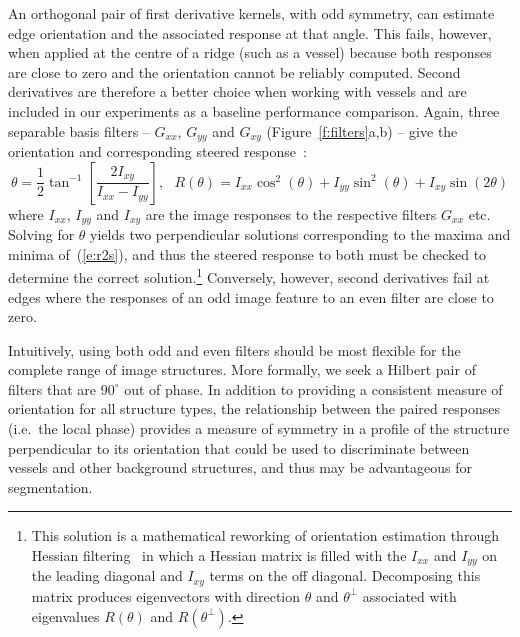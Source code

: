 \documentclass[runningheads,a4paper]{llncs}
\newcommand{\fref}[1]{Figure~\ref{#1}}
\newcommand{\eref}[1]{(\ref{#1})}
\def\Gxx{G_{xx}}
\def\Gxy{G_{xy}} \def\Gyx{G_{yx}}
\def\Gyy{G_{yy}}
\def\Ixx{I_{xx}}
\def\Ixy{I_{xy}}
\def\Iyy{I_{yy}}
\def\ie{i.e.}
\begin{document}
An orthogonal pair of first derivative kernels, with odd symmetry, can estimate edge orientation and the associated response at that angle. This fails, however, when applied at the centre of a ridge (such as a vessel) because both responses are close to zero and the orientation cannot be reliably computed. Second derivatives are therefore a better choice when working with vessels and are included in our experiments as a baseline performance comparison. Again, three separable basis filters -- $\Gxx$, $\Gyy$ and $\Gxy$ (\fref{f:filters}a,b) -- give the orientation and corresponding steered response~\cite{Freeman_Adelson_TPAMI91,Koenderink_vanDoorn_TPAMI92,Karssemeijer_teBrake_TMI96}:
%
\begin{equation}
\theta = \frac{1}{2}\tan^{-1}\left[ \frac{2\Ixy}{\Ixx-\Iyy} \right], \,\,\,\, R(\theta) = \Ixx \cos^2(\theta) + \Iyy \sin^2(\theta) + \Ixy \sin(2\theta)
\label{e:r2s}
\end{equation}
%
\noindent where $\Ixx$, $\Iyy$ and $\Ixy$  are the image responses to the respective filters $\Gxx$ etc. Solving for $\theta$ yields two perpendicular solutions corresponding to the maxima and minima of~\eref{e:r2s}, and thus the steered response to both must be checked to determine the correct solution.\footnote{This solution is a mathematical reworking of orientation estimation through Hessian filtering~\cite{Frangi_MICCAI98,Sato_MIA98} in which a Hessian matrix is filled with the $\Ixx$ and $\Iyy$ on the leading diagonal and $\Ixy$ terms on the off diagonal. Decomposing this matrix produces eigenvectors with direction $\theta$ and $\theta^{\perp}$ associated with eigenvalues $R(\theta)$ and $R(\theta^{\perp})$.} Conversely, however, second derivatives fail at edges where the responses of an odd image feature to an even filter are close to zero.

Intuitively, using both odd and even filters should be most flexible for the complete range of image structures. More formally, we seek a Hilbert pair of filters that are $90^\circ$ out of phase. In addition to providing a consistent measure of orientation for all structure types, the relationship between the paired responses (\ie~the local phase) provides a measure of symmetry in a profile of the structure perpendicular to its orientation that could be used to discriminate between vessels and other background structures, and thus may be advantageous for segmentation.
\end{document}
